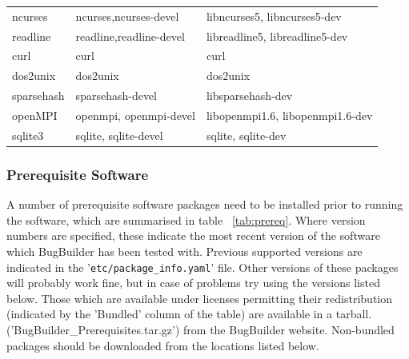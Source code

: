 \documentclass[a4paper,10pt]{article}
\begin{document}
\begin{table}[htb]
{\begin{tabular}{lll}
ncurses                & ncurses,ncurses-devel                   & libncurses5, libncurses5-dev \\
readline               & readline,readline-devel                 & libreadline5, libreadline5-dev \\
curl                   & curl                                    & curl \\
dos2unix               & dos2unix                                & dos2unix \\
sparsehash             & sparsehash-devel                        & libsparsehash-dev\\
openMPI                & openmpi, openmpi-devel                  & libopenmpi1.6, libopenmpi1.6-dev\\
sqlite3                & sqlite, sqlite-devel                    & sqlite, sqlite-dev\\
\hline
\end{tabular}}
\label{tab:ospackages}
\end{table}

\subsubsection{Prerequisite Software}

A number of prerequisite software packages need to be installed prior to
running the software, which are summarised in table ~\ref{tab:prereq}. Where
version numbers are specified, these indicate the most recent version of the
software which  BugBuilder has been tested with. Previous supported versions
are indicated in the '{\tt etc/package\_info.yaml}' file. Other versions of
these packages will probably work fine, but in case of problems try using the
versions listed below. Those which are available under licenses permitting
their redistribution (indicated by the 'Bundled' column of the table) are
available in a tarball.  ('BugBuilder\_Prerequisites.tar.gz') from the
BugBuilder website.  Non-bundled packages should be downloaded from the
locations listed below.
\end{document}
